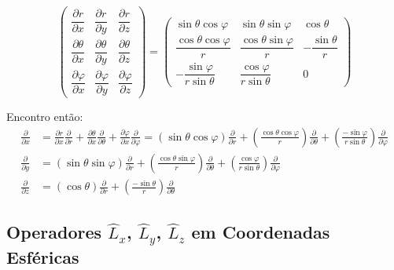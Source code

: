 \begin{equation}
    \begin{pmatrix}
        \dfrac{\partial r}{\partial x} & \dfrac{\partial r}{\partial y} & \dfrac{\partial r}{\partial z} \\[2mm]
        \dfrac{\partial \theta}{\partial x} & \dfrac{\partial \theta}{\partial y} & \dfrac{\partial \theta}{\partial z} \\[2mm]
        \dfrac{\partial \varphi}{\partial x} & \dfrac{\partial \varphi}{\partial y} & \dfrac{\partial \varphi}{\partial z}
    \end{pmatrix}
    =
    \begin{pmatrix}
        \sin\theta\cos\varphi & \sin\theta\sin\varphi & \cos\theta \\[2mm]
        \dfrac{\cos\theta\cos\varphi}{r} & \dfrac{\cos\theta\sin\varphi}{r} & -\dfrac{\sin\theta}{r} \\[2mm]
        -\dfrac{\sin\varphi}{r\sin\theta} & \dfrac{\cos\varphi}{r\sin\theta} & 0
    \end{pmatrix}
\label{eq:aula19_matriz_jacobiana_inversa}
\end{equation}

Encontro então:
\begin{align}
    \frac{\partial}{\partial x} &= \frac{\partial r}{\partial x}\frac{\partial}{\partial r} + \frac{\partial \theta}{\partial x}\frac{\partial}{\partial \theta} + \frac{\partial \varphi}{\partial x}\frac{\partial}{\partial \varphi}
    = (\sin\theta\cos\varphi)\frac{\partial}{\partial r} + \left(\frac{\cos\theta\cos\varphi}{r}\right)\frac{\partial}{\partial \theta} + \left(\frac{-\sin\varphi}{r\sin\theta}\right)\frac{\partial}{\partial \varphi} \label{eq:aula19_ddx_esferica} \\
    \frac{\partial}{\partial y} &= (\sin\theta\sin\varphi)\frac{\partial}{\partial r} + \left(\frac{\cos\theta\sin\varphi}{r}\right)\frac{\partial}{\partial \theta} + \left(\frac{\cos\varphi}{r\sin\theta}\right)\frac{\partial}{\partial \varphi} \label{eq:aula19_ddy_esferica} \\
    \frac{\partial}{\partial z} &= (\cos\theta)\frac{\partial}{\partial r} + \left(\frac{-\sin\theta}{r}\right)\frac{\partial}{\partial \theta} \label{eq:aula19_ddz_esferica}
\end{align}

\subsection*{Operadores $\hat{L}_x$, $\hat{L}_y$, $\hat{L}_z$ em Coordenadas Esféricas}

